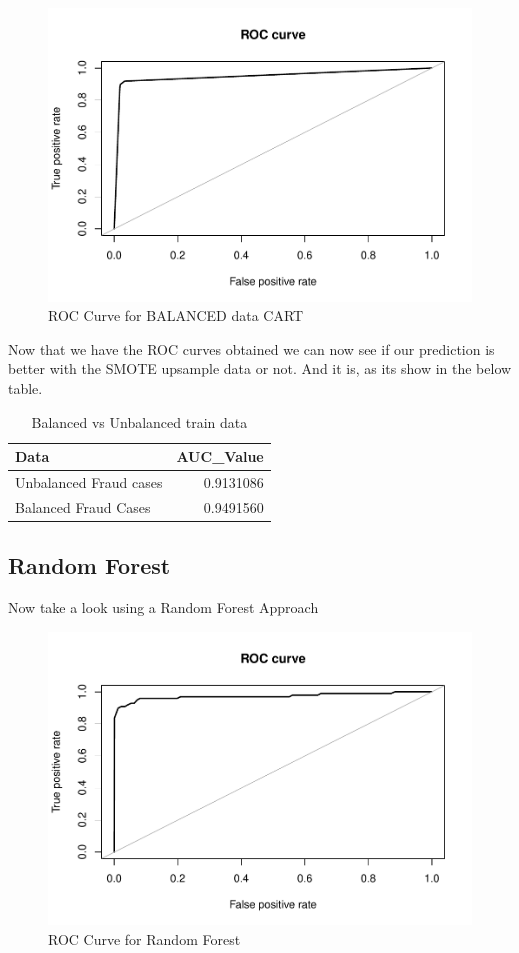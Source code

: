 \documentclass[
]{article}
\begin{document}
\begin{figure}[H]

{\centering \includegraphics[width=0.7\linewidth]{fraudDetectionReport_files/figure-latex/CART_balanced-1} 

}

\caption{ROC Curve for BALANCED data CART}\label{fig:CART_balanced}
\end{figure}

Now that we have the ROC curves obtained we can now see if our
prediction is better with the SMOTE upsample data or not. And it is, as
its show in the below table.

\begin{table}[!h]

\caption{\label{tab:CART_compare}Balanced vs Unbalanced train data}
\centering
\fontsize{10}{12}\selectfont
\begin{tabular}[t]{lr}
\toprule
Data & AUC\_Value\\
\midrule
Unbalanced Fraud cases & 0.9131086\\
Balanced Fraud Cases & 0.9491560\\
\bottomrule
\end{tabular}
\end{table}

\hypertarget{random-forest-1}{%
\subsection{Random Forest}\label{random-forest-1}}

Now take a look using a Random Forest Approach

\begin{figure}[H]

{\centering \includegraphics[width=0.7\linewidth]{fraudDetectionReport_files/figure-latex/Random_Forest-1} 

}

\caption{ROC Curve for Random Forest}\label{fig:Random_Forest}
\end{figure}
\end{document}
